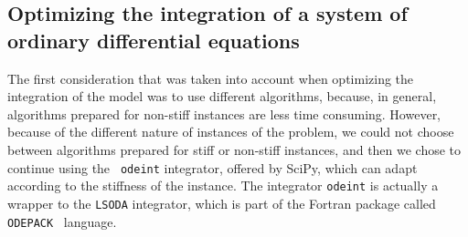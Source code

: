 \subsection{Optimizing the integration of a system of ordinary
differential equations}
The first consideration that was taken into account when optimizing the
integration of the model was to use different algorithms, because, in 
general, algorithms prepared for non-stiff instances are less time
consuming. However, because of the different nature of instances of 
the problem, we could not choose between algorithms prepared for stiff 
or non-stiff instances, and then we chose to continue using the {\tt
odeint} integrator, offered by SciPy, which can adapt according to the
stiffness of the instance. The integrator {\tt odeint} is actually a 
wrapper to the {\tt LSODA} integrator, which is part of the Fortran
package called {\tt ODEPACK}~\cite{Hindmarsh1982} language.



